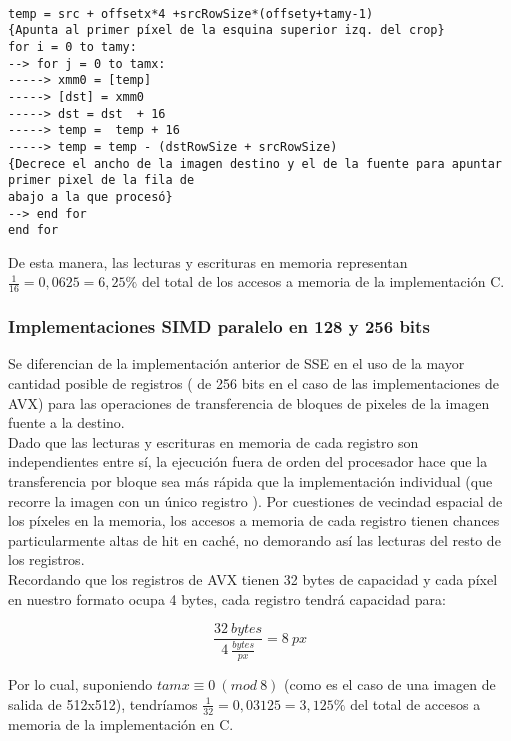\begin{codesnippet}
\begin{verbatim}

temp = src + offsetx*4 +srcRowSize*(offsety+tamy-1)       
{Apunta al primer píxel de la esquina superior izq. del crop}
for i = 0 to tamy:  
--> for j = 0 to tamx:  
-----> xmm0 = [temp]
-----> [dst] = xmm0 
-----> dst = dst  + 16 
-----> temp =  temp + 16 
-----> temp = temp - (dstRowSize + srcRowSize)       
{Decrece el ancho de la imagen destino y el de la fuente para apuntar primer pixel de la fila de
abajo a la que procesó}    
--> end for 
end for 

\end{verbatim}
\end{codesnippet}



De esta manera, las lecturas y escrituras en memoria representan $\frac{1}{16} = 0,0625 =  6,25\%$ del total de los accesos a memoria de la implementación C.


\subsubsection{Implementaciones SIMD paralelo en 128 y 256 bits}
Se diferencian de la implementación anterior de SSE en el uso de la mayor cantidad posible de registros \xmm{} (\ymm{} de 256 bits en el caso de las implementaciones de AVX) para las operaciones de transferencia de bloques de pixeles de la imagen fuente a la destino. 
\\

Dado que las lecturas y escrituras en memoria de cada registro son independientes entre sí, la ejecución fuera de orden del procesador hace que la transferencia por bloque sea más rápida que la implementación individual (que recorre la imagen con un único registro \xmm{}). Por cuestiones de vecindad espacial de los píxeles en la memoria, los accesos a memoria de cada registro tienen chances particularmente altas de hit en caché, no demorando así las lecturas del resto de los registros.
\\

Recordando que los registros de AVX tienen 32 bytes de capacidad y cada píxel en nuestro formato ocupa 4 bytes, cada registro \ymm{} tendrá capacidad para:

$$ \frac{32 \ bytes}{4 \ \frac{bytes}{px}} = 8 \ px $$

Por lo cual, suponiendo $ tamx \equiv 0 \ (mod \ 8) $ (como es el caso de una imagen de salida de 512x512), tendríamos $\frac{1}{32} = 0,03125 =  3,125\%$ del total de accesos a memoria de la implementación en C.

